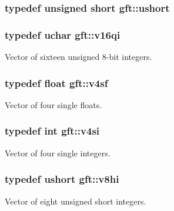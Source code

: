 \hypertarget{namespacegft_a878518cf75338c097e2c8e9b10bfb00d}{
\subsubsection[{ushort}]{\setlength{\rightskip}{0pt plus 5cm}typedef unsigned short {\bf gft\-::ushort}}}\label{namespacegft_a878518cf75338c097e2c8e9b10bfb00d}
\hypertarget{namespacegft_a146b2cce4e032edc85e179b693dbe5f7}{
\subsubsection[{v16qi}]{\setlength{\rightskip}{0pt plus 5cm}typedef {\bf uchar} {\bf gft\-::v16qi}}}\label{namespacegft_a146b2cce4e032edc85e179b693dbe5f7}


Vector of sixteen unsigned 8-\/bit integers. 

\hypertarget{namespacegft_aefb7835e45e071d47ff9320a4015ad8f}{
\subsubsection[{v4sf}]{\setlength{\rightskip}{0pt plus 5cm}typedef float {\bf gft\-::v4sf}}}\label{namespacegft_aefb7835e45e071d47ff9320a4015ad8f}


Vector of four single floats. 

\hypertarget{namespacegft_aba3889d81ba015326f093206316745b7}{
\subsubsection[{v4si}]{\setlength{\rightskip}{0pt plus 5cm}typedef int {\bf gft\-::v4si}}}\label{namespacegft_aba3889d81ba015326f093206316745b7}


Vector of four single integers. 

\hypertarget{namespacegft_ad8aa1dd830c817ab1974c6e4c1b28226}{
\subsubsection[{v8hi}]{\setlength{\rightskip}{0pt plus 5cm}typedef {\bf ushort} {\bf gft\-::v8hi}}}\label{namespacegft_ad8aa1dd830c817ab1974c6e4c1b28226}


Vector of eight unsigned short integers. 


